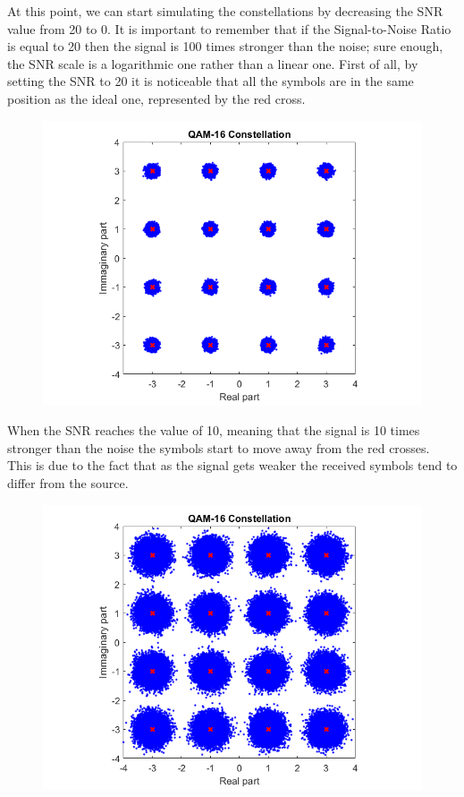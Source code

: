 \noindent At this point, we can start simulating the constellations by decreasing the SNR value from 20 to 0. It is important to remember that if the Signal-to-Noise Ratio is equal to 20 then the signal is 100 times stronger than the noise; sure enough, the SNR scale is a logarithmic one rather than a linear one. First of all, by setting the SNR to 20 it is noticeable that all the symbols are in the same position as the ideal one, represented by the red cross.

\begin{figure}[!h]
    \centering
    \includegraphics[width = .7\textwidth]{lab-6/imgs/SNR20.png}
\end{figure}
\vspace{-10px}

\FloatBarrier\noindent When the SNR reaches the value of 10, meaning that the signal is 10 times stronger than the noise the symbols start to move away from the red crosses. This is due to the fact that as the signal gets weaker the received symbols tend to differ from the source.

\begin{figure}[!h]
    \centering
    \includegraphics[width = .7\textwidth]{lab-6/imgs/SNR10.png}
\end{figure}
\vspace{-10px}


